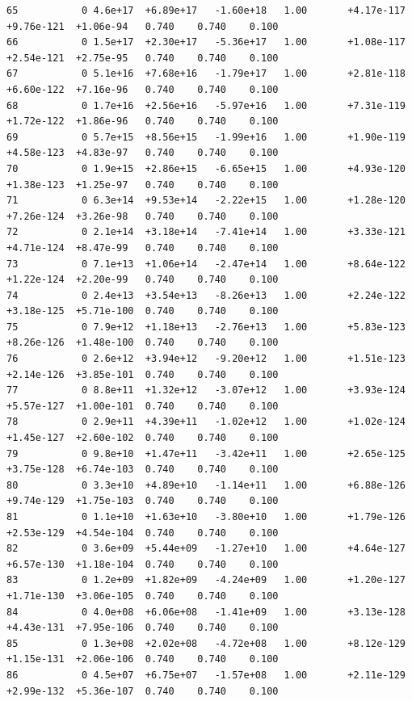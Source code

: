 \documentclass[12pt]{article}
\numberwithin{equation}{section}
\begin{document}
\begin{lstlisting}
65           0 4.6e+17  +6.89e+17   -1.60e+18   1.00       +4.17e-117  +9.76e-121  +1.06e-94   0.740    0.740    0.100
66           0 1.5e+17  +2.30e+17   -5.36e+17   1.00       +1.08e-117  +2.54e-121  +2.75e-95   0.740    0.740    0.100
67           0 5.1e+16  +7.68e+16   -1.79e+17   1.00       +2.81e-118  +6.60e-122  +7.16e-96   0.740    0.740    0.100
68           0 1.7e+16  +2.56e+16   -5.97e+16   1.00       +7.31e-119  +1.72e-122  +1.86e-96   0.740    0.740    0.100
69           0 5.7e+15  +8.56e+15   -1.99e+16   1.00       +1.90e-119  +4.58e-123  +4.83e-97   0.740    0.740    0.100
70           0 1.9e+15  +2.86e+15   -6.65e+15   1.00       +4.93e-120  +1.38e-123  +1.25e-97   0.740    0.740    0.100
71           0 6.3e+14  +9.53e+14   -2.22e+15   1.00       +1.28e-120  +7.26e-124  +3.26e-98   0.740    0.740    0.100
72           0 2.1e+14  +3.18e+14   -7.41e+14   1.00       +3.33e-121  +4.71e-124  +8.47e-99   0.740    0.740    0.100
73           0 7.1e+13  +1.06e+14   -2.47e+14   1.00       +8.64e-122  +1.22e-124  +2.20e-99   0.740    0.740    0.100
74           0 2.4e+13  +3.54e+13   -8.26e+13   1.00       +2.24e-122  +3.18e-125  +5.71e-100  0.740    0.740    0.100
75           0 7.9e+12  +1.18e+13   -2.76e+13   1.00       +5.83e-123  +8.26e-126  +1.48e-100  0.740    0.740    0.100
76           0 2.6e+12  +3.94e+12   -9.20e+12   1.00       +1.51e-123  +2.14e-126  +3.85e-101  0.740    0.740    0.100
77           0 8.8e+11  +1.32e+12   -3.07e+12   1.00       +3.93e-124  +5.57e-127  +1.00e-101  0.740    0.740    0.100
78           0 2.9e+11  +4.39e+11   -1.02e+12   1.00       +1.02e-124  +1.45e-127  +2.60e-102  0.740    0.740    0.100
79           0 9.8e+10  +1.47e+11   -3.42e+11   1.00       +2.65e-125  +3.75e-128  +6.74e-103  0.740    0.740    0.100
80           0 3.3e+10  +4.89e+10   -1.14e+11   1.00       +6.88e-126  +9.74e-129  +1.75e-103  0.740    0.740    0.100
81           0 1.1e+10  +1.63e+10   -3.80e+10   1.00       +1.79e-126  +2.53e-129  +4.54e-104  0.740    0.740    0.100
82           0 3.6e+09  +5.44e+09   -1.27e+10   1.00       +4.64e-127  +6.57e-130  +1.18e-104  0.740    0.740    0.100
83           0 1.2e+09  +1.82e+09   -4.24e+09   1.00       +1.20e-127  +1.71e-130  +3.06e-105  0.740    0.740    0.100
84           0 4.0e+08  +6.06e+08   -1.41e+09   1.00       +3.13e-128  +4.43e-131  +7.95e-106  0.740    0.740    0.100
85           0 1.3e+08  +2.02e+08   -4.72e+08   1.00       +8.12e-129  +1.15e-131  +2.06e-106  0.740    0.740    0.100
86           0 4.5e+07  +6.75e+07   -1.57e+08   1.00       +2.11e-129  +2.99e-132  +5.36e-107  0.740    0.740    0.100

\end{lstlisting}
\end{document}
